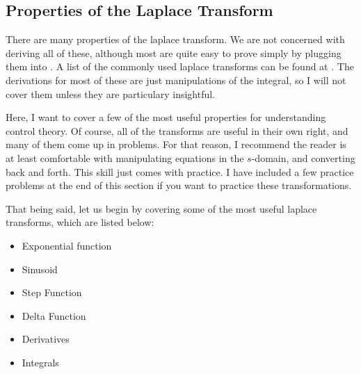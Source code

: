 \subsection{Properties of the Laplace Transform}\label{sec:properties of laplace transform}

There are many properties of the \gls{laplace transform}. We are not concerned with deriving all of these, although most are quite easy to prove simply by plugging them into . A list of the commonly used \glspl{laplace transform} can be found at \cite{dawkins_differential_nodate}. The derivations for most of these are just manipulations of the integral, so I will not cover them unless they are particulary insightful.

Here, I want to cover a few of the most useful properties for understanding control theory. Of course, all of the transforms are useful in their own right, and many of them come up in problems. For that reason, I recommend the reader is at least comfortable with manipulating equations in the $s$-domain, and converting back and forth. This skill just comes with practice. I have included a few practice problems at the end of this section if you want to practice these transformations.

That being said, let us begin by covering some of the most useful \glspl{laplace transform}, which are listed below:
\begin{itemize}
    \item Exponential function
    \item Sinusoid
    \item Step Function
    \item Delta Function
    \item Derivatives
    \item Integrals
\end{itemize}

